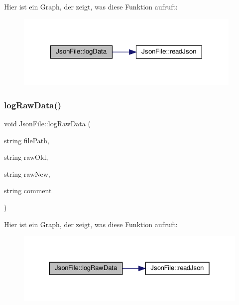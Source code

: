 Hier ist ein Graph, der zeigt, was diese Funktion aufruft\+:\nopagebreak
\begin{figure}[H]
\begin{center}
\leavevmode
\includegraphics[width=308pt]{class_json_file_a69c66d052ccb40a11396f537787a6343_cgraph}
\end{center}
\end{figure}
\mbox{\label{class_json_file_a8361a5de646f07365b7baeae80f6d3eb}} 
\subsubsection{log\+Raw\+Data()}
{\footnotesize\ttfamily void Json\+File\+::log\+Raw\+Data (\begin{DoxyParamCaption}\item[{string}]{file\+Path,  }\item[{string}]{raw\+Old,  }\item[{string}]{raw\+New,  }\item[{string}]{comment }\end{DoxyParamCaption})}

Hier ist ein Graph, der zeigt, was diese Funktion aufruft\+:\nopagebreak
\begin{figure}[H]
\begin{center}
\leavevmode
\includegraphics[width=328pt]{class_json_file_a8361a5de646f07365b7baeae80f6d3eb_cgraph}
\end{center}
\end{figure}
\mbox{\label{class_json_file_a0b7eb46810847ba22ea137a4ce4757ae}} 
